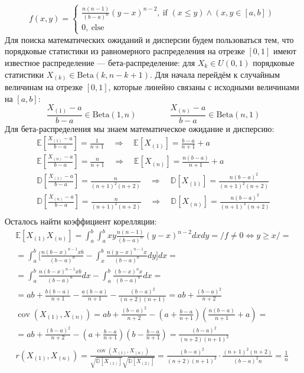 \documentclass[14pt]{extarticle}
\begin{document}
\begin{equation*}
    f(x, y) = 
    \begin{cases}
      \frac{n(n-1)}{(b-a)^n}(y-x)^{n-2},~ \text{if } (x \leqslant y) \wedge (x, y \in [a, b])\\
      0, ~\text{else}
    \end{cases}\,
\end{equation*}
Для поиска математических ожиданий и дисперсии будем пользоваться тем, что порядковые статистики из равномерного распределения на отрезке $[0,1]$ имеют известное распределение — бета-распределение: для $X_k \in U(0,1)$ порядковые статистики $X_{(k)}\in\mathrm{Beta}(k,n-k+1)$. Для начала перейдём к случайным величинам на отрезке $[0,1]$, которые линейно связаны с исходными величинами на $[a,b]$:
$$\frac{X_{(1)} - a}{b-a} \in\mathrm{Beta}(1,n) \quad \quad \quad \quad \frac{X_{(n)} - a}{b-a} \in\mathrm{Beta}(n,1)$$
 Для бета-распределения мы знаем математическое ожидание и дисперсию:\\
\begin{gather*}
    \mathbb{E}\left[\frac{X_{(1)} - a}{b-a}\right] = \frac{1}{n+1} \quad \Rightarrow \quad \mathbb{E}[X_{(1)}] = \frac{b-a}{n+1} + a \\
    \mathbb{E}\left[\frac{X_{(n)} - a}{b-a}\right] = \frac{n}{n+1} \quad \Rightarrow \quad \mathbb{E}[X_{(n)}] = \frac{n(b-a)}{n+1} + a \\
    \mathbb{D}\left[\frac{X_{(1)} - a}{b-a}\right] = \frac{n}{(n+1)^2(n+2)} \quad \Rightarrow \quad \mathbb{D}[X_{(1)}] = \frac{n(b-a)^2}{(n+1)^2(n+2)} \\
    \mathbb{D}\left[\frac{X_{(n)} - a}{b-a}\right] = \frac{n}{(n+1)^2(n+2)} \quad \Rightarrow \quad \mathbb{D}[X_{(n)}] = \frac{n(b-a)^2}{(n+1)^2(n+2)} \\
\end{gather*}
Осталось найти коэффициент корелляции:
\begin{gather*}
\mathbb{E}\left[X_{(1)} X_{(n)}\right]=\int_a^b \int_a^b  x y \frac{n(n-1)}{(b-a)^n}(y-x)^{n-2}dxdy=\biggr/f \neq 0 \Leftrightarrow y \geqslant x \biggr/ = \\ = \int_a^b \biggl[\frac{n(b-x)^{n-1} x b}{(b-a)^n} - \int_x^b \frac{n(y-x)^{n-1} x}{(b-a)^n} d y\biggr] dx= \\ = \int_a^b \frac{n(b-x)^{n-1} x b}{(b-a)^n} d x-\int_a^b \frac{(b-x)^n x}{(b-a)^n} dx = \\
=a b+\frac{b(b-a)}{n+1}-\frac{a(b-a)}{n+1}-\frac{(b-a)^2}{(n+2)(n+1)}=a b+\frac{(b-a)^2}{n+2} \\
\operatorname{cov}\left(X_{(1)}, X_{(n)}\right)=a b+\frac{(b-a)^2}{n+2}-\left(a+\frac{b-a}{n+1}\right) \left(\frac{n(b-a)}{n+1} + a\right)= \\
=a b+\frac{(b-a)^2}{n+2}-\left(a+\frac{b-a}{n+1}\right) \left(b-\frac{b-a}{n+1}\right)
=\frac{(b-a)^2}{(n+2)(n+1)^2} \\ 
r\left(X_{(1)}, X_{(n)}\right)=\frac{\operatorname{cov}\left(X_{(1)}, X_{(n)}\right)}{\sqrt{\mathbb{D}[X_{(1)}]} \sqrt{\mathbb{D}[X_{(2)}]}}=\frac{(b-a)^2}{(n+2)(n+1)^2} \cdot \frac{(n+1)^2(n+2)}{(b-a)^2  n}=\frac{1}{n}
\end{gather*}
\end{document}

